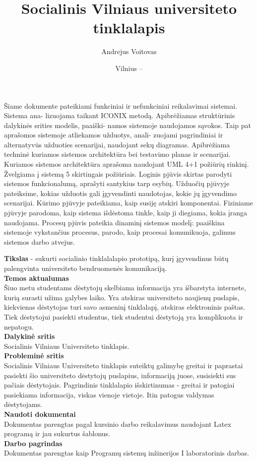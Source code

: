 \documentclass{VUMIFPSkursinis}
\title{Socialinis Vilniaus universiteto tinklalapis}
\author{Andrejus Voitovas}
\date{Vilnius – \the\year}
\begin{document}
\maketitle
\cleardoublepage{}
\setcounter{page}{2}
Šiame dokumente pateikiami funkciniai ir nefunkciniai reikalavimai sistemai. Sistema ana-
lizuojama taikant ICONIX metodą. Apibrėžiamas struktūrinis dalykinės srities modelis, paaiški-
namos sistemoje naudojamos sąvokos. Taip pat aprašomos sistemoje atliekamos užduotys, anali-
zuojami pagrindiniai ir alternatyvūs užduoties scenarijai, naudojant sekų diagramas. Apibrėžiama
techninė kuriamos sistemos architektūra bei testavimo planas ir scenarijai. Kuriamos sistemos architektūra aprašoma naudojant UML 4+1 požiūrių
rinkinį. Žvelgiama į sistemą 5 skirtingais požiūriais. Loginis pjūvis skirtas parodyti sistemos
funkcionalumą, aprašyti santykius tarp esybių. Užduočių pjūvyje pateiksime, kokias užduotis gali
įgyvendinti naudotojas, kokie jų įgyvendimo scenarijai. Kūrimo pjūvyje pateikiama, kaip susiję atskiri
komponentai. Fiziniame pjūvyje parodoma, kaip sistema išdėstoma tinkle, kaip ji diegiama,
kokia įranga naudojama. Procesų pjūvis pateikia dinaminį sistemos modelį: paaiškina sistemoje
vykstančius procesus, parodo, kaip procesai komunikuoja, galimus sistemos darbo atvejus.
\newpage
\tableofcontents
\begin{center}
\end{center}
\textbf{Tikslas}  - sukurti socialinio tinklalalapio prototipą, kurį įgyvendinus būtų palengvinta universiteto bendruomenės komunikaciją.\\
\textbf{Temos aktualumas} \\
Šiuo metu studentams dėstytojų skelbiama informacija yra išbarstyta internete, kurią surasti užima galybes laiko. Yra atskiras universiteto naujienų puslapis, kiekvienas dėstytojas turi savo asmeninį tinklalapį, atskiras elektroninis paštas. Tiek dėstytojui pasiekti studentus, tiek studentui dėstytoją yra komplikuota ir nepatogu.\\
\textbf{Dalykinė sritis}\\
Socialinis Vilniaus Universiteto tinklapis.\\
\textbf{Probleminė sritis}\\
Socialinis Vilniaus Universiteto tinklapis suteiktų galimybę greitai ir paprastai pasiekti šio universiteto dėstytojų puslapius, informaciją juose, susisiekti sus pačiais dėstytojais. Pagrindinis tinklalapio išskirtinumas - greitai ir patogiai pasiekiama informacija, viskas vienoje vietoje. Itin patogus valdymas dėstytojams.\\
 \textbf{Naudoti dokumentai}\\
 Dokumentas parengtas pagal kursinio darbo reikalavimus naudojant Latex programą ir jau sukurtus šablonus.\\
 \textbf{Darbo pagrindas} \\ 
Dokumentas parengtas kaip Programų sistemų inžinerijos I laboratorinis darbas.
\newpage
\end{document}
